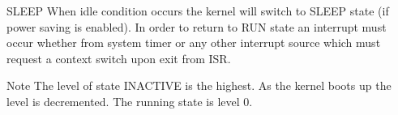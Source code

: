 \begin{DoxyParagraph}{S\-L\-E\-E\-P}
When idle condition occurs the kernel will switch to {\ttfamily S\-L\-E\-E\-P} state (if power saving is enabled). In order to return to {\ttfamily R\-U\-N} state an interrupt must occur whether from system timer or any other interrupt source which must request a context switch upon exit from I\-S\-R.
\end{DoxyParagraph}
\begin{DoxyNote}{Note}
The level of state {\ttfamily I\-N\-A\-C\-T\-I\-V\-E} is the highest. As the kernel boots up the level is decremented. The running state is level 0. 
\end{DoxyNote}
